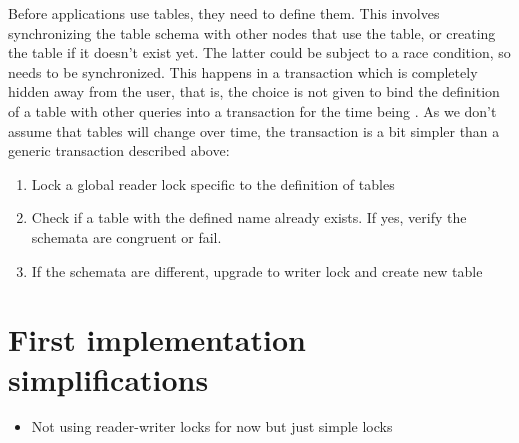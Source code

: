 \documentclass{article}
\begin{document}
Before applications use tables, they need to define them. This involves
synchronizing the table schema with other nodes that use the table, or creating
the table if it doesn't exist yet. The latter could be subject to a race
condition, so needs to be synchronized. This happens in a transaction which is
completely hidden away from the user, that is, the choice is not given to bind 
the
definition of a table with other queries into a transaction for the time being
. As we don't
assume that tables will change over time, the transaction is a bit simpler than
a generic transaction described above:

\begin{enumerate}
  \item Lock a global reader lock specific to the definition of tables
  \item Check if a table with the defined name already exists. If yes, verify
    the schemata are congruent or fail.
  \item If the schemata are different, upgrade to writer lock and create new
    table
\end{enumerate}

\section{First implementation simplifications}

\begin{itemize}
  \item Not using reader-writer locks for now but just simple locks
\end{itemize}
\end{document}
